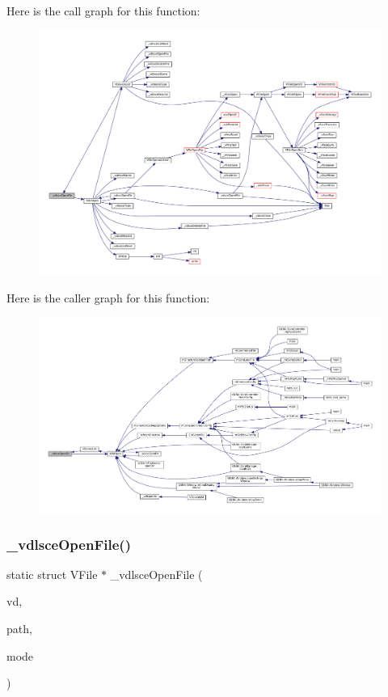 Here is the call graph for this function\+:
\nopagebreak
\begin{figure}[H]
\begin{center}
\leavevmode
\includegraphics[width=350pt]{sce-vfs_8c_a0577478b314a3785a307d6ccfefb9627_cgraph}
\end{center}
\end{figure}
Here is the caller graph for this function\+:
\nopagebreak
\begin{figure}[H]
\begin{center}
\leavevmode
\includegraphics[width=350pt]{sce-vfs_8c_a0577478b314a3785a307d6ccfefb9627_icgraph}
\end{center}
\end{figure}
\mbox{\label{sce-vfs_8c_aa338c926cc1b185d9be42e478649e857}} 
\subsubsection{\texorpdfstring{\+\_\+vdlsce\+Open\+File()}{\_vdlsceOpenFile()}}
{\footnotesize\ttfamily static struct V\+File $\ast$ \+\_\+vdlsce\+Open\+File (\begin{DoxyParamCaption}\item[{struct V\+Dir $\ast$}]{vd,  }\item[{const char $\ast$}]{path,  }\item[{\mbox{\hyperlink{ioapi_8h_a787fa3cf048117ba7123753c1e74fcd6}{int}}}]{mode }\end{DoxyParamCaption})\hspace{0.3cm}{\ttfamily [static]}}

